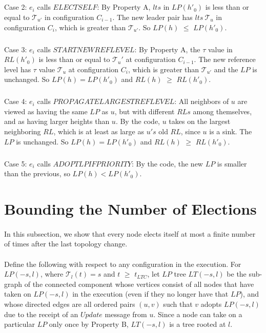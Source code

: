 \subparagraph{}Case 2: $e_i$ calls $ELECTSELF$: By Property A, $lts$ in $LP(h'_0 )$ is less than or equal to $\mathcal{T} _{u'}$ in configuration $C_{i-1}$. The new leader pair has $lts~\mathcal{T} _u$ in configuration $C_i$, which is greater than $\mathcal{T} _{u'}$. So $LP(h)$ $\leq$ $LP(h'_0 )$.
\subparagraph{}Case 3: $e_i$ calls $STARTNEWREFLEVEL$: By Property A, the $\tau$ value in $RL(h'_0 )$ is less than or equal to $\mathcal{T}_u'$ at configuration $C_{i-1}$. The new reference level has $\tau$ value $\mathcal{T}_u$ at configuration $C_i$, which is greater than $\mathcal{T}_{u'}$ and the $LP$ is unchanged. So $LP(h) = LP(h'_0 )$ and $RL(h)$ $\geq$ $RL(h'_0 )$.
\subparagraph{}Case 4: $e_i$ calls $PROPAGATELARGESTREFLEVEL$: All neighbors of $u$ are viewed as having the same $LP$ as $u$, but with different $RLs$ among themselves, and as having larger heights than $u$. By the code, $u$ takes on the largest neighboring $RL$, which is at least as large as $u's$ old $RL$, since $u$ is a sink. The $LP$ is unchanged. So $LP(h) = LP(h'_0 )$ and $RL(h)$ $\geq$ $RL(h'_0 )$.
\subparagraph{}Case 5: $e_i$ calls $ADOPTLPIFPRIORITY$: By the code, the new $LP$ is smaller than the previous, so $LP(h) < LP(h'_0 )$.
\newpage
\section{Bounding the Number of Elections}
\paragraph{}In this subsection, we show that every node elects itself at most a finite number of times after the last topology change.
\paragraph{}Define the following with respect to any configuration in the execution. For $LP (-s, l)$, where $\mathcal{T}_l (t) = s$ and $t$ $\geq$ $t_{LTC}$, let $LP$ tree $LT (-s, l)$ be the sub-graph of the connected component whose vertices consist of all nodes that have taken on $LP (-s, l)$ in the execution (even if they no longer have that $LP$), and whose directed edges are all ordered pairs $(u, v)$ such that $v$ adopts $LP (-s, l)$ due to the receipt of an $Update$ message from $u$. Since a node can take on a particular $LP$ only once by Property B, $LT (-s, l)$ is a tree rooted at $l$.
